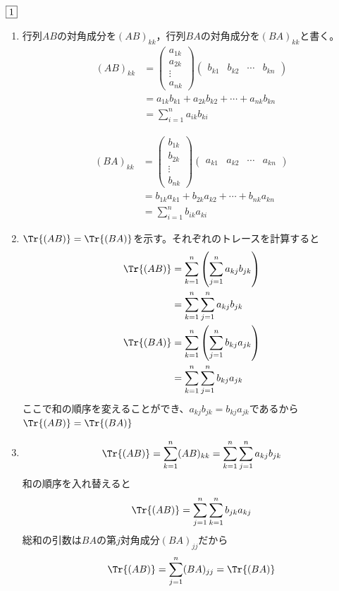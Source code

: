 \begin{souanswer} %
	$\fbox{1}$ 
\begin{enumerate}
	\item 行列$AB$の対角成分を$(AB)_{kk}$，行列$BA$の対角成分を$(BA)_{kk}$と書く。
\begin{align*}
	(AB)_{kk}
&= \begin{pmatrix}a_{1k}\\ a_{2k}\\ \vdots\\ a_{nk}\end{pmatrix}\begin{pmatrix}b_{k1}& b_{k2}& \cdots& b_{kn}\end{pmatrix}\\
&= a_{1k}b_{k1}+ a_{2k}b_{k2}+ \cdots+ a_{nk}b_{kn}\\
&= \sum_{i= 1}^n a_{ik}b_{ki}
\end{align*}

\begin{align*}
	(BA)_{kk}
&= \begin{pmatrix}b_{1k}\\ b_{2k}\\ \vdots\\ b_{nk}\end{pmatrix}\begin{pmatrix}a_{k1}& a_{k2}& \cdots& a_{kn}\end{pmatrix}\\
&= b_{1k}a_{k1}+ b_{2k}a_{k2}+ \cdots+ b_{nk}a_{kn}\\
&= \sum_{i= 1}^n b_{ik}a_{ki}
\end{align*}

	\item $\Tr{(AB)}= \Tr{(BA)}$を示す。それぞれのトレースを計算すると
\begin{align*}
	\Tr{(AB)}
&= \sum_{k= 1}^n \left(\sum_{j= 1}^ n a_{kj}b_{jk}\right)\\
&= \sum_{k= 1}^n \sum_{j= 1}^ n a_{kj}b_{jk}\\
	\Tr{(BA)}
&= \sum_{k= 1}^n \left(\sum_{j= 1}^ n b_{kj}a_{jk}\right)\\
&= \sum_{k= 1}^n \sum_{j= 1}^n b_{kj}a_{jk}
\end{align*}
	ここで和の順序を変えることができ、$a_{kj}b_{jk}= b_{kj}a_{jk}$であるから$\Tr{(AB)}= \Tr{(BA)}$

	\item 
\begin{equation*}
	\Tr{(AB)}= \sum_{k= 1}^n(AB)_{kk}= \sum_{k= 1}^n \sum_{j= 1}^n a_{kj}b_{jk}
\end{equation*}
	和の順序を入れ替えると
\begin{equation*}
	\Tr{(AB)}= \sum_{j= 1}^n\sum_{k= 1}^n b_{jk}a_{kj}
\end{equation*}
	総和の引数は$BA$の第$j$対角成分$(BA)_{jj}$だから
\begin{equation*}
	\Tr{(AB)}= \sum_{j= 1}^n(BA)_{jj}= \Tr{(BA)}
\end{equation*}


\end{enumerate}
\end{souanswer}
